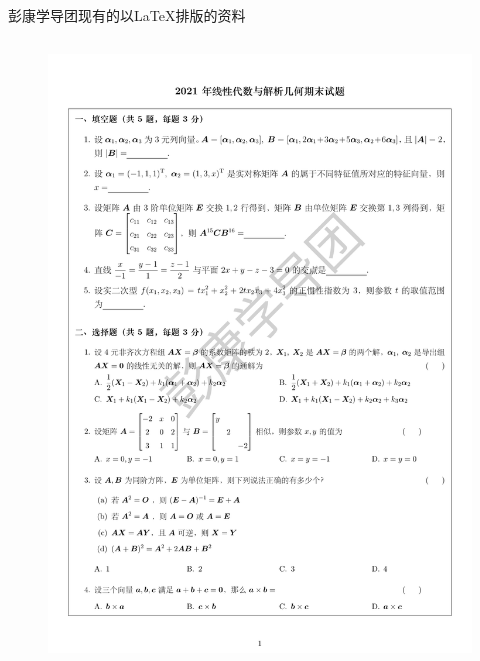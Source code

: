 \begin{frame}{彭康学导团现有的以\LaTeX 排版的资料}
\begin{itemize}
\begin{columns}
\begin{column}{0.48\textwidth}
\begin{figure}
                    \centering
                    \includegraphics[scale=0.2]{figures/PK_XDZT.pdf}
                \end{figure}
            \end{column}
        \end{columns}
    \end{itemize}
\end{frame}